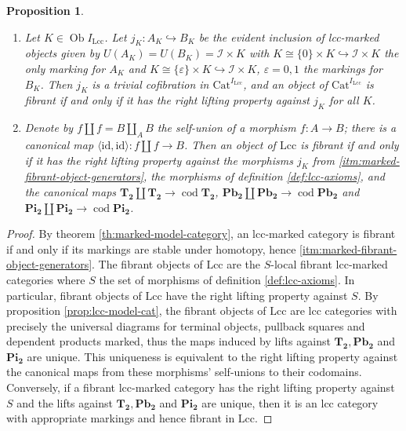 \documentclass[a4paper]{article}
\newtheorem{proposition}[theorem]{Proposition}
\theoremstyle{remark}
\theoremstyle{definition}
\begin{document}
\begin{proposition}
  \label{prop:object-generating-triv-cof-lcc}
  \begin{enumerate}
    \item
      \label{itm:marked-fibrant-object-generators}
      Let $K \in \operatorname{Ob} I_\mathrm{Lcc}$.
      Let $j_K : A_K \hookrightarrow B_K$ be the evident inclusion of lcc-marked objects given by $U(A_K) = U(B_K) = \mathcal{I} \times K$ with $K \cong \{ 0 \} \times K \hookrightarrow \mathcal{I} \times K$ the only marking for $A_K$ and $K \cong \{ \varepsilon \} \times K \hookrightarrow \mathcal{I} \times K$, $\varepsilon = 0, 1$ the markings for $B_K$.
      Then $j_K$ is a trivial cofibration in $\mathrm{Cat}^{I_\mathrm{Lcc}}$, and an object of $\mathrm{Cat}^{I_\mathrm{Lcc}}$ is fibrant if and only if it has the right lifting property against $j_K$ for all $K$.
    \item
      \label{itm:lcc-fibrant-object-generators}
      Denote by $f \amalg f = B \amalg_A B$ the self-union of a morphism $f : A \rightarrow B$; there is a canonical map $\langle \mathrm{id}, \mathrm{id} \rangle : f \amalg f \rightarrow B$.
      Then an object of $\mathrm{Lcc}$ is fibrant if and only if it has the right lifting property against the morphisms $j_K$ from \ref{itm:marked-fibrant-object-generators}, the morphisms of definition \ref{def:lcc-axioms}, and the canonical maps $\mathbf{T_2} \amalg \mathbf{T_2} \rightarrow \operatorname{cod} \mathbf{T_2}$, $\mathbf{Pb_2} \amalg \mathbf{Pb_2} \rightarrow \operatorname{cod} \mathbf{Pb_2}$ and $\mathbf{Pi_2} \amalg \mathbf{Pi_2} \rightarrow \operatorname{cod} \mathbf{Pi_2}$.
  \end{enumerate}
\end{proposition}
\begin{proof}
  By theorem \ref{th:marked-model-category}, an lcc-marked category is fibrant if and only if its markings are stable under homotopy, hence \ref{itm:marked-fibrant-object-generators}.
  The fibrant objects of $\mathrm{Lcc}$ are the $S$-local fibrant lcc-marked categories where $S$ the set of morphisms of definition \ref{def:lcc-axioms}.
  In particular, fibrant objects of $\mathrm{Lcc}$ have the right lifting property against $S$.
  By proposition \ref{prop:lcc-model-cat}, the fibrant objects of $\mathrm{Lcc}$ are lcc categories with precisely the universal diagrams for terminal objects, pullback squares and dependent products marked, thus the maps induced by lifts against $\mathbf{T_2}, \mathbf{Pb_2}$ and $\mathbf{Pi_2}$ are unique.
  This uniqueness is equivalent to the right lifting property against the canonical maps from these morphisms' self-unions to their codomains.
  Conversely, if a fibrant lcc-marked category has the right lifting property against $S$ and the lifts against $\mathbf{T_2}, \mathbf{Pb_2}$ and $\mathbf{Pi_2}$ are unique, then it is an lcc category with appropriate markings and hence fibrant in $\mathrm{Lcc}$.
\end{proof}
\end{document}
